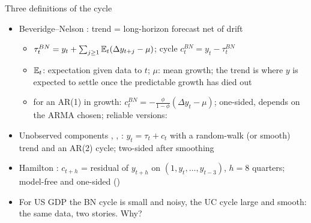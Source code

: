 \begin{frame}{Three definitions of the cycle}
\itemsize{\small}
\begin{itemize}
    \item Beveridge--Nelson : trend = long-horizon forecast net of drift
    \begin{itemize}
        \item $\tau^{BN}_t = y_t + \sum_{j\ge1}\mathbb{E}_t(\Delta y_{t+j} - \mu)$; cycle $c^{BN}_t = y_t - \tau^{BN}_t$
        \item $\mathbb{E}_t$: expectation given data to $t$; $\mu$: mean growth; the trend is where $y$ is expected to settle once the predictable growth has died out
        \item for an AR(1) in growth: $c^{BN}_t = -\frac{\phi}{1 - \phi}(\Delta y_t - \mu)$; one-sided, depends on the ARMA chosen; reliable versions: 
    \end{itemize}
    \item Unobserved components , , : $y_t = \tau_t + c_t$ with a random-walk (or smooth) trend and an AR(2) cycle; two-sided after smoothing
    \item Hamilton : $c_{t+h}$ = residual of $y_{t+h}$ on $(1, y_t, \dots, y_{t-3})$, $h = 8$ quarters; model-free and one-sided ()
    \item For US GDP the BN cycle is small and noisy, the UC cycle large and smooth: the same data, two stories. Why?
\end{itemize}
\end{frame}


